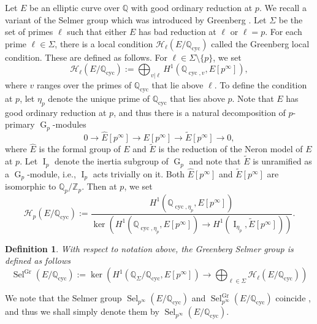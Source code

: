 \documentclass[12pt]{amsart}
\newtheorem{definition}[theorem]{Definition}
\newcommand{\cH}{\mathcal{H}}
\newcommand{\Z}{\mathbb{Z}}
\newcommand{\Q}{\mathbb{Q}}
\newcommand{\op}[1]{\operatorname{#1}}
\numberwithin{equation}{section}
\begin{document}
\par Let $E$ be an elliptic curve over $\Q$ with good ordinary reduction at $p$. We recall a variant of the Selmer group which was introduced by Greenberg \cite{Greenberpadic}. Let $\Sigma$ be the set of primes $\ell$ such that either $E$ has bad reduction at $\ell$ or $\ell=p$. For each prime $\ell\in \Sigma$, there is a local condition $\cH_\ell(E/\Q_{\op{cyc}})$ called the Greenberg local condition. These are defined as follows. For $\ell\in \Sigma\setminus \{p\}$, we set 
\[\cH_\ell(E/\Q_{\op{cyc}}):=\bigoplus_{v|\ell} H^1(\Q_{\op{cyc}, v}, E[p^\infty]),\] where $v$ ranges over the primes of $\Q_{\op{cyc}}$ that lie above $\ell$. To define the condition at $p$, let $\eta_p$ denote the unique prime of $\Q_{\op{cyc}}$ that lies above $p$. Note that $E$ has good ordinary reduction at $p$, and thus there is a natural decomposition of $p$-primary $\op{G}_{p}$-modules
\[0\rightarrow \widehat{E}[p^\infty]\rightarrow E[p^\infty]\rightarrow \widetilde{E}[p^\infty]\rightarrow 0,\] where $\widehat{E}$ is the formal group of $E$ and $\widetilde{E}$ is the reduction of the Neron model of $E$ at $p$. Let $\op{I}_{p}$ denote the inertia subgroup of $\op{G}_p$ and note that $\widetilde{E}$ is unramified as a $\op{G}_p$-module, i.e., $\op{I}_p$ acts trivially on it. Both $\widehat{E}[p^\infty]$ and $\widetilde{E}[p^\infty]$ are isomorphic to $\Q_p/\Z_p$. Then at $p$, we set 
\[\cH_p(E/\Q_{\op{cyc}}):= \frac{H^1(\Q_{\op{cyc}, \eta_p}, E[p^\infty])}{\op{ker}\left(H^1(\Q_{\op{cyc}, \eta_p}, E[p^\infty])\longrightarrow H^1(\op{I}_{\eta_p}, \widetilde{E}[p^\infty])\right)}.\]
\begin{definition}
    With respect to notation above, the Greenberg Selmer group is defined as follows
    \[\op{Sel}^{\op{Gr}}(E/\Q_{\op{cyc}}):=\op{ker}\left(H^1(\Q_\Sigma/\Q_{\op{cyc}}, E[p^\infty])\longrightarrow \bigoplus_{\ell\in \Sigma} \cH_\ell(E/\Q_{\op{cyc}})\right)\]
\end{definition}
We note that the Selmer group $\op{Sel}_{p^\infty}(E/\Q_{\op{cyc}})$ and $\op{Sel}_{p^\infty}^{\op{Gr}}(E/\Q_{\op{cyc}})$ coincide \cite[Ch.2, Propositions 2.1 and 2.4]{GreenbergITEC}, and thus we shall simply denote them by $\op{Sel}_{p^\infty}(E/\Q_{\op{cyc}})$. 
\end{document}
